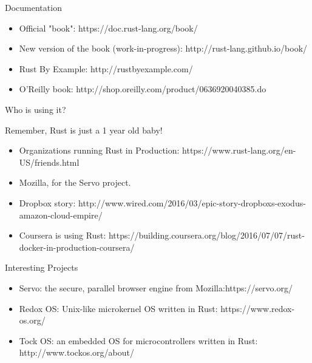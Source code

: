 \documentclass{beamer}
\begin{document}
\begin{frame}{Documentation}

\begin{itemize}

\item Official "book": https://doc.rust-lang.org/book/

\item New version of the book (work-in-progress): http://rust-lang.github.io/book/

\item Rust By Example: http://rustbyexample.com/

\item O'Reilly book: http://shop.oreilly.com/product/0636920040385.do

\end{itemize}

\end{frame}

\begin{frame}{Who is using it?}

Remember, Rust is just a 1 year old baby!

\begin{itemize} 

\item Organizations running Rust in 
      Production: https://www.rust-lang.org/en-US/friends.html

\item Mozilla, for the Servo project. 

\item Dropbox story: http://www.wired.com/2016/03/epic-story-dropboxs-exodus-amazon-cloud-empire/

\item Coursera is using Rust: https://building.coursera.org/blog/2016/07/07/rust-docker-in-production-coursera/


\end{itemize}

\end{frame}

\begin{frame}{Interesting Projects}


\begin{itemize} 

\item Servo: the secure, parallel browser engine from Mozilla:https://servo.org/

\item Redox OS: Unix-like microkernel OS written in Rust: https://www.redox-os.org/

\item Tock  OS: an embedded OS for microcontrollers written in Rust: http://www.tockos.org/about/


\end{itemize}

\end{frame}
\end{document}
